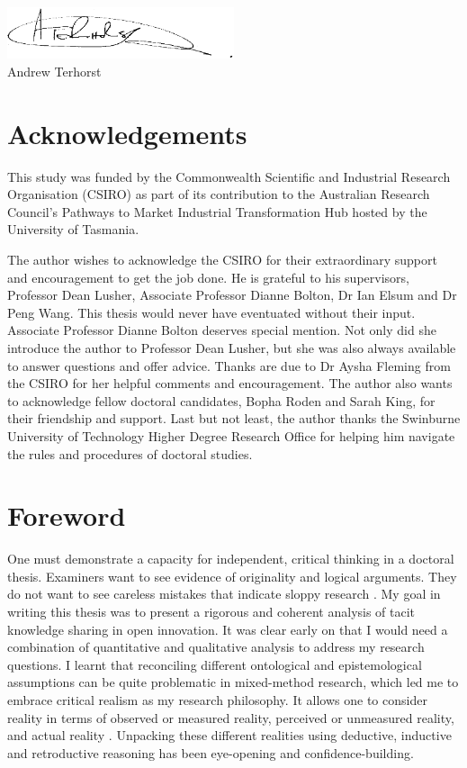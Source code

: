 \documentclass[12pt,table]{book}
\renewcommand{\today}{\the\day \ \monthname \ \the\year}
\begin{document}
\includegraphics[width = 0.5\textwidth]{Images/Signature.png}\\
Andrew Terhorst\\
\shortdate{\today}

\chapter*{Acknowledgements}

This study was funded by the Commonwealth Scientific and Industrial Research Organisation (CSIRO) as part of its contribution to the Australian Research Council's Pathways to Market Industrial Transformation Hub hosted by the University of Tasmania. \medskip

\noindent
The author wishes to acknowledge the CSIRO for their extraordinary support and encouragement to get the job done. He is grateful to his supervisors, Professor Dean Lusher, Associate Professor Dianne Bolton, Dr Ian Elsum and Dr Peng Wang. This thesis would never have eventuated without their input. Associate Professor Dianne Bolton deserves special mention. Not only did she introduce the author to Professor Dean Lusher, but she was also always available to answer questions and offer advice. Thanks are due to Dr Aysha Fleming from the CSIRO for her helpful comments and encouragement. The author also wants to acknowledge fellow doctoral candidates, Bopha Roden and Sarah King, for their friendship and support. Last but not least, the author thanks the Swinburne University of Technology Higher Degree Research Office for helping him navigate the rules and procedures of doctoral studies. \medskip

\chapter*{Foreword}

One must demonstrate a capacity for independent, critical thinking in a doctoral thesis. Examiners want to see evidence of originality and logical arguments. They do not want to see careless mistakes that indicate sloppy research \citep{mullins2002its}. My goal in writing this thesis was to present a rigorous and coherent analysis of tacit knowledge sharing in open innovation. It was clear early on that I would need a combination of quantitative and qualitative analysis to address my research questions. I learnt that reconciling different ontological and epistemological assumptions can be quite problematic in mixed-method research, which led me to embrace critical realism as my research philosophy. It allows one to consider reality in terms of observed or measured reality, perceived or unmeasured reality, and actual reality \citep{bhaskar2013realist}. Unpacking these different realities using deductive, inductive and retroductive reasoning has been eye-opening and confidence-building. \medskip
\end{document}
